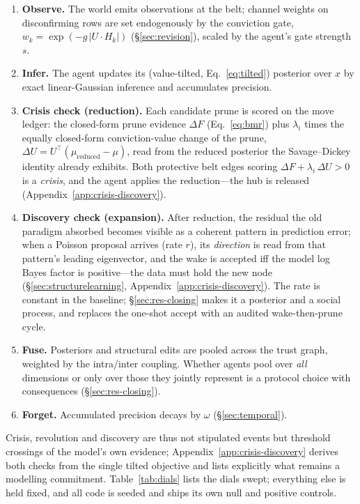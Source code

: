 \documentclass[11pt]{article}
\begin{document}
\begin{enumerate}\itemsep1pt
\item \textbf{Observe.} The world emits observations at the belt; channel weights on disconfirming
rows are set endogenously by the conviction gate, $w_k=\exp(-g\,|U\!\cdot\!H_k|)$
(\S\ref{sec:revision}), scaled by the agent's gate strength $s$.
\item \textbf{Infer.} The agent updates its (value-tilted, Eq.~\ref{eq:tilted}) posterior over $x$ by
exact linear-Gaussian inference and accumulates precision.
\item \textbf{Crisis check (reduction).} Each candidate prune is scored on the move ledger: the
closed-form prune evidence $\Delta F$ (Eq.~\ref{eq:bmr}) plus $\lambda_i$ times the equally
closed-form conviction-value change of the prune,
$\Delta U = U^{\!\top}\!(\mu_{\mathrm{reduced}}-\mu)$, read from the reduced posterior the
Savage--Dickey identity already exhibits. Both protective belt edges scoring
$\Delta F + \lambda_i\,\Delta U > 0$ is a \emph{crisis}, and the agent applies the reduction---the
hub is released (Appendix~\ref{app:crisis-discovery}).
\item \textbf{Discovery check (expansion).} After reduction, the residual the old paradigm absorbed
becomes visible as a coherent pattern in prediction error; when a Poisson proposal arrives (rate
$r$), its \emph{direction} is read from that pattern's leading eigenvector, and the wake is
accepted iff the model log Bayes factor is positive---the data must hold the new node
(\S\ref{sec:structurelearning}, Appendix~\ref{app:crisis-discovery}). The rate is constant in
the baseline; \S\ref{sec:res-closing} makes it a posterior and a social process, and replaces the
one-shot accept with an audited wake-then-prune cycle.
\item \textbf{Fuse.} Posteriors and structural edits are pooled across the trust graph, weighted by
the intra/inter coupling. Whether agents pool over \emph{all} dimensions or only over those they
jointly represent is a protocol choice with consequences (\S\ref{sec:res-closing}).
\item \textbf{Forget.} Accumulated precision decays by $\omega$ (\S\ref{sec:temporal}).
\end{enumerate}

Crisis, revolution and discovery are thus not stipulated events but threshold crossings of the
model's own evidence; Appendix~\ref{app:crisis-discovery} derives both checks from the single
tilted objective and lists explicitly what remains a modelling commitment.
Table~\ref{tab:dials} lists the dials swept; everything else is held fixed, and
all code is seeded and ships its own null and positive controls.
\end{document}
